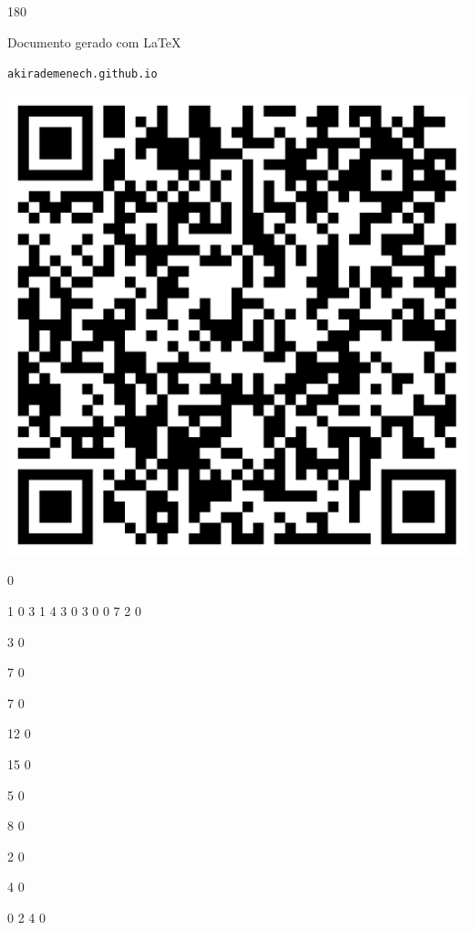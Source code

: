 \documentclass[12pt]{article}
\begin{document}
	\begin{turn}{180}	
		\begin{minipage}{\textwidth}		  
		  Documento gerado com \LaTeX			
		  
		  \texttt{akirademenech.github.io}

		  \includegraphics[height=0.3\textheight]{2e-2.pdf}

		\end{minipage}	
	\end{turn}  
		  
		\vfill  
		  
{
	0	%

	1	%
	0	%
	3	%
	1	%
	4	%
	3	%
	0	%
	3	%
	0	%
	0	%
	7	%
	2	%
	0	%

	3	%
	0	%

	7	%
	0	%

	7	%
	0	%

	12	%
	0	%

	15	%
	0	%

	5	%
	0	%

	8	%
	0	%

	2	%
	0	%

	4	%
	0	%

	0	%
	2	%
	4	%
	0	%

}	  
		    	
\end{document}
